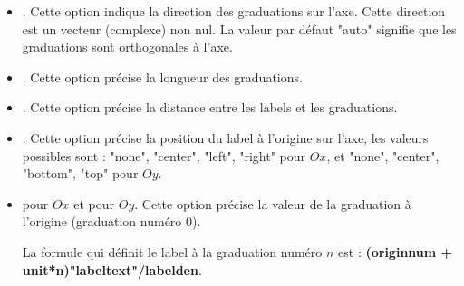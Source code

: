 \documentclass[%
10pt,%
a4paper,%
french,%
]%
{article}%
\begin{document}
\begin{itemize}
\begin{itemize}
            \item {}. Cette option indique la direction des graduations sur l'axe. Cette direction est un vecteur (complexe) non nul. La valeur par défaut "auto" signifie que les graduations sont orthogonales à l'axe.
            \item {}. Cette option précise la longueur des graduations.
            \item {}. Cette option précise la distance entre les labels et les graduations.
            \item {}. Cette option précise la position du label à l'origine sur l'axe, les valeurs possibles sont : "none", "center", "left", "right" pour $Ox$, et "none", "center", "bottom", "top" pour $Oy$.
            \item {} pour $Ox$ et  pour $Oy$. Cette option précise la valeur de la graduation à l'origine (graduation numéro $0$). 
            
            La formule qui définit le label à la graduation numéro $n$ est : \textbf{(originnum + unit*n)"labeltext"/labelden}.


\end{itemize}
\end{itemize}
\end{document}
